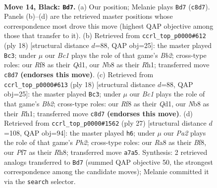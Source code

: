 \documentclass[11pt]{article}
\begin{document}
\clearpage

\begin{figure}[p]\centering
\begin{subfigure}{0.46\textwidth}\centering
\resizebox{\linewidth}{!}{%
\newchessgame
\chessboard[
  setfen={rnb2rk1/pp3ppp/1q2p3/8/Q1B1P1nP/5N2/PP1N2P1/R3K2R b KQ - 2 14},
  showmover=false,
  pgfstyle=straightmove, color=movearrow, markmove={c8-d7}
]}
\caption{}
\end{subfigure}\hfill
\begin{subfigure}{0.46\textwidth}\centering
\resizebox{\linewidth}{!}{%
\newchessgame
\chessboard[
  setfen={r3kb1r/pp1n1ppp/2p2n2/q3P3/2P5/5P2/PB2PP1P/RN1QKB1R w KQkq - 1 10},
  showmover=false,
  pgfstyle=straightmove, color=movearrow, markmove={b2-c3}
]}
\caption{}
\end{subfigure}
\\[4pt]
\begin{subfigure}{0.46\textwidth}\centering
\resizebox{\linewidth}{!}{%
\newchessgame
\chessboard[
  setfen={r3kb1r/pp1n1ppp/2p2n2/q3P3/2P5/5P2/PB2PP1P/RN1QKB1R w KQkq - 1 10},
  showmover=false,
  pgfstyle=straightmove, color=movearrow, markmove={b2-c3}
]}
\caption{}
\end{subfigure}\hfill
\begin{subfigure}{0.46\textwidth}\centering
\resizebox{\linewidth}{!}{%
\newchessgame
\chessboard[
  setfen={r3kb1r/3npppp/p1pq4/6B1/P2PQ3/2P2N2/5PPP/R3K2R b KQkq - 0 14},
  showmover=false,
  pgfstyle=straightmove, color=movearrow, markmove={h7-h6}
]}
\caption{}
\end{subfigure}
\caption{\textbf{Move 14, Black: \texttt{Bd7}.} (a) Our position; Melanie plays \texttt{Bd7} (\texttt{c8d7}). Panels (b)--(d) are the retrieved master positions whose correspondence most drove this move (highest QAP objective among those that transfer to it). (b) Retrieved from \texttt{ccrl\_top\_p0000\#612} (ply 18) [structural distance $d$=88, QAP obj=25]: the master played \texttt{Bc3}; under $\mu$ our \emph{Bc1} plays the role of that game's \emph{Bb2}; cross-type roles: our \emph{R}f8 as their \emph{Q}d1, our \emph{N}b8 as their \emph{R}h1; transferred move \texttt{c8d7} \textbf{(endorses this move)}. (c) Retrieved from \texttt{ccrl\_top\_p0000\#613} (ply 18) [structural distance $d$=88, QAP obj=25]: the master played \texttt{Bc3}; under $\mu$ our \emph{Bc1} plays the role of that game's \emph{Bb2}; cross-type roles: our \emph{R}f8 as their \emph{Q}d1, our \emph{N}b8 as their \emph{R}h1; transferred move \texttt{c8d7} \textbf{(endorses this move)}. (d) Retrieved from \texttt{ccrl\_top\_p0000\#1562} (ply 27) [structural distance $d$=108, QAP obj=94]: the master played \texttt{h6}; under $\mu$ our \emph{Pa2} plays the role of that game's \emph{Ph2}; cross-type roles: our \emph{R}a8 as their \emph{B}f8, our \emph{P}f7 as their \emph{R}h8; transferred move \texttt{a7a5}. Synthesis: 2 retrieved analogs transferred to \texttt{Bd7} (summed QAP objective 50, the strongest correspondence among the candidate moves); Melanie committed it via the \texttt{search} selector.}
\label{fig:thought-m27}
\end{figure}
\end{document}
